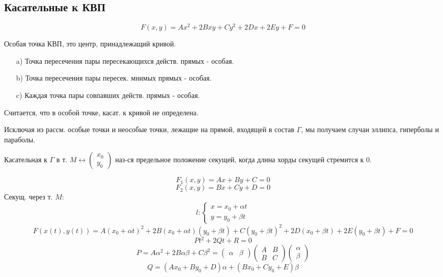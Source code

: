 \subsection{Касательные к КВП}
\begin{equation}
F(x, y) = Ax^{2} + 2Bxy + Cy^{2} + 2Dx + 2Ey + F = 0
\end{equation}
\begin{definition}
Особая точка КВП, это центр, принадлежащий кривой.
\begin{itemize}
  \item [a) ] Точка пересечения пары пересекающихся действ. прямых - особая.
  \item [b) ] Точка пересечения пары пересек. мнимых прямых - особая.
  \item [c) ] Каждая точка пары совпавших действ. прямых - особая.
\end{itemize}
Считается, что в особой точке, касат. к кривой не определена.
\end{definition}
Исключая из рассм. особые точки и неособые точки, лежащие на прямой, входящей в состав $\Gamma$, мы получаем случаи эллипса, гиперболы и параболы.
\begin{definition}
Касательная к $\Gamma$ в т. $M \underset{}{\longleftrightarrow} \begin{pmatrix}x_0 \\ y_0 \end{pmatrix}$ наз-ся предельное положение секущей, когда длина хорды секущей стремится к 0.
\end{definition}
\[
F_1(x, y) = Ax + By + C = 0
\]
\[
F_2(x, y) = Bx + Cy + D = 0
\]
Секущ. через т. $M$:
\[
l\colon \begin{cases}
x = x_0 + \alpha t \\
y = y_0 + \beta t
\end{cases}
\]
\[
F(x(t), y(t)) = A(x_0 + \alpha t)^{2} + 2B(x_0 + \alpha t)(y_0 + \beta t) + C(y_0 + \beta t)^{2} + 2D(x_0 + \beta t) + 2E(y_0 + \beta t) + F = 0
\]
\[
Pt^{2} + 2Qt + R = 0
\]
\[
  P = A\alpha^{2} + 2B\alpha\beta + C\beta^{2} = \begin{pmatrix}\alpha & \beta \end{pmatrix}\begin{pmatrix}A & B \\ B & C \end{pmatrix}\begin{pmatrix}\alpha \\ \beta \end{pmatrix}
\]
\[
  Q = (Ax_0 + By_0 + D)\alpha + (Bx_0 + Cy_0 + E)\beta
\]
